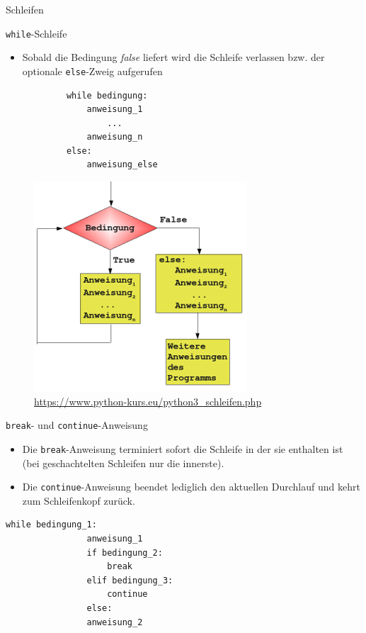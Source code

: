 \documentclass[utf8, smaller, c]{beamer}
\renewcommand{\tt}[1]{{\texttt{#1}}}
\begin{document}
\begin{frame}{Schleifen}
\begin{block}{\tt{while}-Schleife}
\begin{itemize}
			\item Sobald die Bedingung \textit{false} liefert wird die Schleife verlassen bzw. der optionale \tt{else}-Zweig aufgerufen
		\end{itemize}
		\begin{minipage}[h]{0.4\textwidth}
			\begin{lstlisting}
			while bedingung:
				anweisung_1
					...
				anweisung_n
			else:
				anweisung_else
			\end{lstlisting}
		\end{minipage}
		\hfill
		\begin{minipage}[h]{0.58\textwidth}
		\begin{figure}[hb]
		    \centering
			\includegraphics[scale=0.45]{pics/schleife2.png}
			{\tiny\url{https://www.python-kurs.eu/python3_schleifen.php}}
		\end{figure}
	\end{minipage}
	\end{block}
	\pagebreak
	\begin{block}{\tt{break}- und \tt{continue}-Anweisung}
		\begin{itemize}
			\item Die \tt{break}-Anweisung terminiert sofort die Schleife in der sie enthalten ist (bei geschachtelten Schleifen nur die innerste).
			\item Die \tt{continue}-Anweisung beendet lediglich den aktuellen Durchlauf und kehrt zum Schleifenkopf zurück.
		\end{itemize}
		\begin{minipage}[h]{0.4\textwidth}
			\begin{lstlisting}[basicstyle=\footnotesize]
			while bedingung_1:
				anweisung_1
				if bedingung_2:
					break
				elif bedingung_3:
					continue
				else:
				anweisung_2

\end{lstlisting}
\end{minipage}
\end{block}
\end{frame}
\end{document}
